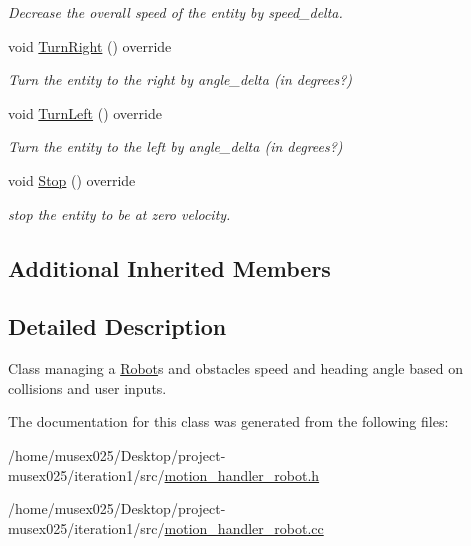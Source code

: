 \begin{DoxyCompactItemize}
\begin{DoxyCompactList}\small\item\em Decrease the overall speed of the entity by speed\+\_\+delta. \end{DoxyCompactList}\item 
void \hyperlink{classMotionHandlerRobot_a4b18204b7c7f7f8a3cbb7f0e8ccf088f}{Turn\+Right} () override\hypertarget{classMotionHandlerRobot_a4b18204b7c7f7f8a3cbb7f0e8ccf088f}{}\label{classMotionHandlerRobot_a4b18204b7c7f7f8a3cbb7f0e8ccf088f}

\begin{DoxyCompactList}\small\item\em Turn the entity to the right by angle\+\_\+delta (in degrees?) \end{DoxyCompactList}\item 
void \hyperlink{classMotionHandlerRobot_a955ca2693c4188ffb08cfde469e58252}{Turn\+Left} () override\hypertarget{classMotionHandlerRobot_a955ca2693c4188ffb08cfde469e58252}{}\label{classMotionHandlerRobot_a955ca2693c4188ffb08cfde469e58252}

\begin{DoxyCompactList}\small\item\em Turn the entity to the left by angle\+\_\+delta (in degrees?) \end{DoxyCompactList}\item 
void \hyperlink{classMotionHandlerRobot_a735287a2ab240ae0655def3afb0839f1}{Stop} () override\hypertarget{classMotionHandlerRobot_a735287a2ab240ae0655def3afb0839f1}{}\label{classMotionHandlerRobot_a735287a2ab240ae0655def3afb0839f1}

\begin{DoxyCompactList}\small\item\em stop the entity to be at zero velocity. \end{DoxyCompactList}\end{DoxyCompactItemize}
\subsection*{Additional Inherited Members}


\subsection{Detailed Description}
Class managing a \hyperlink{classRobot}{Robot}\textquotesingle{}s and obstacle\textquotesingle{}s speed and heading angle based on collisions and user inputs. 

The documentation for this class was generated from the following files\+:\begin{DoxyCompactItemize}
\item 
/home/musex025/\+Desktop/project-\/musex025/iteration1/src/\hyperlink{motion__handler__robot_8h}{motion\+\_\+handler\+\_\+robot.\+h}\item 
/home/musex025/\+Desktop/project-\/musex025/iteration1/src/\hyperlink{motion__handler__robot_8cc}{motion\+\_\+handler\+\_\+robot.\+cc}\end{DoxyCompactItemize}
